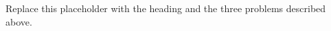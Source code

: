 \documentclass{article}
\begin{document}
Replace this placeholder with the heading and the three problems
described above.
\end{document}

